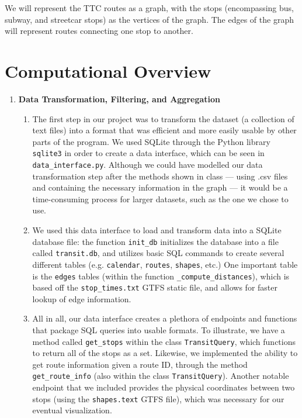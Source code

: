 \documentclass[fontsize=11pt]{article}
\begin{document}
    We will represent the TTC routes as a graph, with the stops (encompassing bus, subway, and streetcar stops) as the vertices of the graph. The edges of the graph will represent routes connecting one stop to another.

    \section*{Computational Overview}

    \begin{enumerate}
        \item \textbf{Data Transformation, Filtering, and Aggregation}
        \begin{enumerate}
            \item The first step in our project was to transform the dataset (a collection of text files) into a format that was efficient and more easily usable by other parts of the program. We used SQLite through the Python library \texttt{sqlite3} in order to create a data interface, which can be seen in \texttt{data\_interface.py}. Although we could have modelled our data transformation step after the methods shown in class — using .csv files and containing the necessary information in the graph — it would be a time-consuming process for larger datasets, such as the one we chose to use. \\

            \item We used this data interface to load and transform data into a SQLite database file: the function \texttt{init\_db} initializes the database into a file called \texttt{transit.db}, and utilizes basic SQL commands to create several different tables (e.g. \texttt{calendar}, \texttt{routes}, \texttt{shapes}, etc.) One important table is the \texttt{edges} tables (within the function \texttt{\_compute\_distances}), which is based off the \texttt{stop\_times.txt} GTFS static file, and allows for faster lookup of edge information. \\

            \item All in all, our data interface creates a plethora of endpoints and functions that package SQL queries into usable formats. To illustrate, we have a method called \texttt{get\_stops} within the class \texttt{TransitQuery}, which functions to return all of the stops as a set. Likewise, we implemented the ability to get route information given a route ID, through the method \texttt{get\_route\_info} (also within the class \texttt{TransitQuery}). Another notable endpoint that we included provides the physical coordinates between two stops (using the \texttt{shapes.text} GTFS file), which was necessary for our eventual visualization. \\


\end{enumerate}
\end{enumerate}
\end{document}

